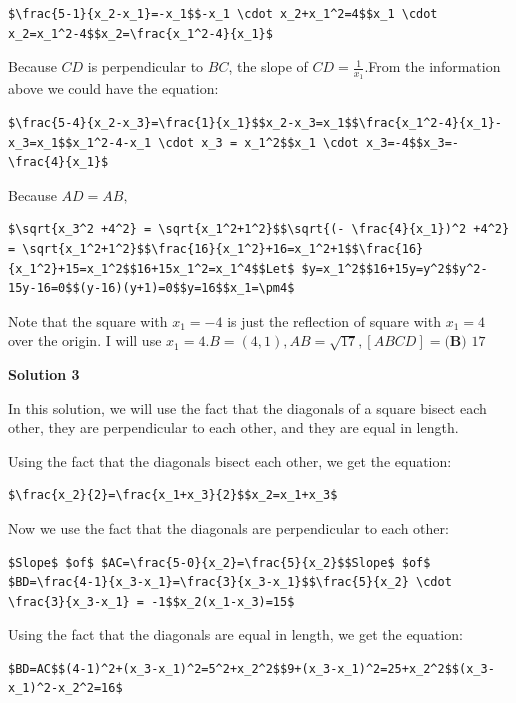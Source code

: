 \begin{enumerate}
 \begin{verbatim}
$\frac{5-1}{x_2-x_1}=-x_1$$-x_1 \cdot x_2+x_1^2=4$$x_1 \cdot x_2=x_1^2-4$$x_2=\frac{x_1^2-4}{x_1}$
\end{verbatim}

Because $CD$ is perpendicular to $BC$, the slope of $CD=\frac{1}{x_1}$.From the information above we could have the equation: 

 \begin{verbatim}
$\frac{5-4}{x_2-x_3}=\frac{1}{x_1}$$x_2-x_3=x_1$$\frac{x_1^2-4}{x_1}-x_3=x_1$$x_1^2-4-x_1 \cdot x_3 = x_1^2$$x_1 \cdot x_3=-4$$x_3=- \frac{4}{x_1}$
\end{verbatim}

Because $AD=AB,$
\begin{verbatim}
$\sqrt{x_3^2 +4^2} = \sqrt{x_1^2+1^2}$$\sqrt{(- \frac{4}{x_1})^2 +4^2} = \sqrt{x_1^2+1^2}$$\frac{16}{x_1^2}+16=x_1^2+1$$\frac{16}{x_1^2}+15=x_1^2$$16+15x_1^2=x_1^4$$Let$ $y=x_1^2$$16+15y=y^2$$y^2-15y-16=0$$(y-16)(y+1)=0$$y=16$$x_1=\pm4$
\end{verbatim}

Note that the square with $x_1=-4$ is just the reflection of square with $x_1=4$ over the origin. I will use $x_1=4$.$B=(4,1), AB=\sqrt{17}, [ABCD]=\boxed{\textbf{(B) }17}$




\textbf{Solution 3}

In this solution, we will use the fact that the diagonals of a square bisect each other, they are perpendicular to each other, and they are equal in length.

 Using the fact that the diagonals bisect each other, we get the equation:

 \begin{verbatim}
$\frac{x_2}{2}=\frac{x_1+x_3}{2}$$x_2=x_1+x_3$
\end{verbatim}

Now we use the fact that the diagonals are perpendicular to each other:

 \begin{verbatim}
$Slope$ $of$ $AC=\frac{5-0}{x_2}=\frac{5}{x_2}$$Slope$ $of$ $BD=\frac{4-1}{x_3-x_1}=\frac{3}{x_3-x_1}$$\frac{5}{x_2} \cdot \frac{3}{x_3-x_1} = -1$$x_2(x_1-x_3)=15$
\end{verbatim}

Using the fact that the diagonals are equal in length, we get the equation:

 \begin{verbatim}
$BD=AC$$(4-1)^2+(x_3-x_1)^2=5^2+x_2^2$$9+(x_3-x_1)^2=25+x_2^2$$(x_3-x_1)^2-x_2^2=16$
\end{verbatim}


\end{enumerate}
